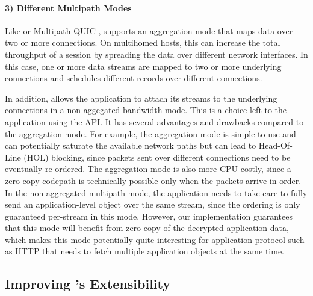 \paragraph*{3) Different Multipath Modes}
Like \mptcp \cite{raiciu2012hard,rfc6824} or Multipath QUIC \cite{viernickel2018multipath,de2017multipath,draft-deconinck-quic-multipath-06,draft-liu-multipath-quic-02}, \tcpls supports an aggregation mode that maps data over two or more \tcp connections. On multihomed hosts, this can increase the total throughput of a \tcpls session by spreading the data over different network interfaces. In this case, one or more data streams are mapped to two or more underlying \tcp connections and \tcpls schedules different records over different connections.

In addition, \tcpls allows the application to attach its streams to the
underlying \tcp connections in a non-aggegated bandwidth mode. This is a choice left to the application using the API. It has several advantages and drawbacks compared to the aggregation mode. For example, the aggregation mode is simple to use and can potentially saturate the available network paths but can lead to Head-Of-Line (HOL) blocking, since packets sent over different \tcp connections need to be eventually re-ordered. The aggregation mode is also more CPU costly, since a zero-copy codepath is technically possible only when the packets arrive in order. In the non-aggregated multipath mode, the application needs to take care to fully send an application-level object over the same stream, since the ordering is only guaranteed per-stream in this mode. However, our \tcpls implementation guarantees that this mode will benefit from zero-copy of the decrypted application data, which makes this mode potentially quite interesting for application protocol such as HTTP that needs to fetch multiple application objects at the same time.

\subsection{Improving \tcp's Extensibility}

